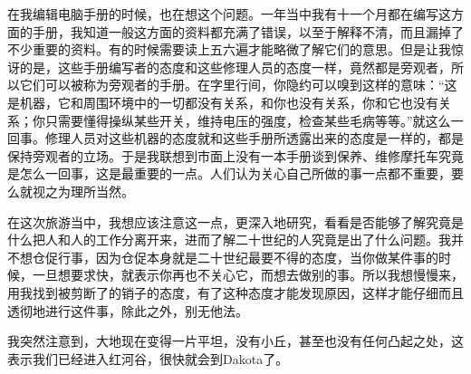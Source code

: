 \documentclass[UTF8]{article}
\begin{document}
\par 在我编辑电脑手册的时候，也在想这个问题。一年当中我有十一个月都在编写这方面的手册，我知道一般这方面的资料都充满了错误，以至于解释不清，而且漏掉了不少重要的资料。有的时候需要读上五六遍才能略微了解它们的意思。但是让我惊讶的是，这些手册编写者的态度和这些修理人员的态度一样，竟然都是旁观者，所以它们可以被称为旁观者的手册。在字里行间，你隐约可以嗅到这样的意味：“这是机器，它和周围环境中的一切都没有关系，和你也没有关系，你和它也没有关系；你只需要懂得操纵某些开关，维持电压的强度，检查某些毛病等等。”就这么一回事。修理人员对这些机器的态度就和这些手册所透露出来的态度是一样的，都是保持旁观者的立场。于是我联想到市面上没有一本手册谈到保养、维修摩托车究竟是怎么一回事，这是最重要的一点。人们认为关心自己所做的事一点都不重要，要么就视之为理所当然。
\par 在这次旅游当中，我想应该注意这一点，更深入地研究，看看是否能够了解究竟是什么把人和人的工作分离开来，进而了解二十世纪的人究竟是出了什么问题。我并不想仓促行事，因为仓促本身就是二十世纪最要不得的态度，当你做某件事的时候，一旦想要求快，就表示你再也不关心它，而想去做别的事。所以我想慢慢来，用我找到被剪断了的销子的态度，有了这种态度才能发现原因，这样才能仔细而且透彻地进行这件事，除此之外，别无他法。
\par 我突然注意到，大地现在变得一片平坦，没有小丘，甚至也没有任何凸起之处，这表示我们已经进入红河谷，很快就会到Dakota了。
\end{document}
